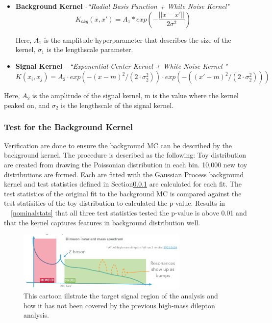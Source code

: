 \begin{itemize}
    \item \textbf{Background Kernel} \textit{-``Radial Basis Function + White Noise Kernel"}
        \begin{equation}
                K_{bkg}(x, x') = A_{1} * exp(-\frac{||x-x'||}{2\sigma^{2}}) 
        \label{eq:backgroundkernel}
        \end{equation}

    Here, $A_{1}$ is the amplitude hyperparameter that describes the size of the kernel, $\sigma_{1}$ is the lengthscale parameter.
\item \textbf{Signal Kernel} \textit{- ``Exponential Center Kernel + White Noise Kernel "}
            \begin{equation}
            K(x_{i}, x_{j})=A_{2}\cdot exp(-(x-m)^{2}/(2\cdot\sigma_{2}^{2}))\cdot exp(-((x'-m)^{2}/(2\cdot\sigma_{2}^{2})))
            \end{equation}
\end{itemize}

    Here, $A_{2}$ is the amplitude of the signal kernel, m is the value where the kernel peaked on, and $\sigma_{2}$ is the lengthscale of the signal kernel. 

\subsubsection{Test for the Background Kernel}
Verification are done to ensure the background MC can be described by the background kernel. The procedure is described as the following: Toy distribution are created from drawing the Poissonian distribution in each bin. 10,000 new toy distributions are formed. Each are fitted with the Gaussian Process background kernel and test statistics defined in Section\ref{} are calculated for each fit. The test statistics of the original fit to the background MC is compared against the test statisitics of
the toy distribution to calculated the p-value. Results in ~\Figure~\ref{nominalstats} that all three test statistics tested the p-value is above 0.01 and that the kernel captures features in background distribution well. 

\begin{figure}[!htb]
    \begin{center}
        \includegraphics[width=0.75\textwidth]{figures/chapter_dimuon/dimuonStudies}        
        \caption{
        This cartoon illstrate the target signal region of the analysis and how it has not been covered by the previous high-mass dilepton analysis. }
            \label{fig:dimuonstudies}
    \end{center}
\end{figure}


